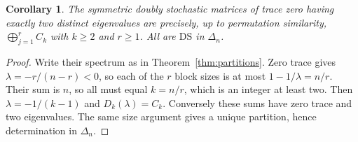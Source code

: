 \documentclass[11pt]{article}
\newtheorem{corollary}[theorem]{Corollary}
\newcommand{\DS}{\mathrm{DS}}
\newcommand{\Del}{\Delta}
\begin{document}
\begin{corollary}\label{cor:zero}
The symmetric doubly stochastic matrices of trace zero having exactly two distinct eigenvalues are precisely, up to permutation similarity,
$\bigoplus_{j=1}^r C_k$ with $k\geq2$ and $r\geq1$.
All are $\DS$ in $\Del_n$.
\end{corollary}
\begin{proof}
Write their spectrum as in Theorem~\ref{thm:partitions}. Zero trace gives
$\lambda=-r/(n-r)<0$, so each of the $r$ block sizes is at most $1-1/\lambda=n/r$.
Their sum is $n$, so all must equal $k=n/r$, which is an integer at least two.
Then $\lambda=-1/(k-1)$ and $D_k(\lambda)=C_k$.
Conversely these sums have zero trace and two eigenvalues. The same size argument gives a unique partition, hence determination in $\Del_n$.
\end{proof}
\end{document}
